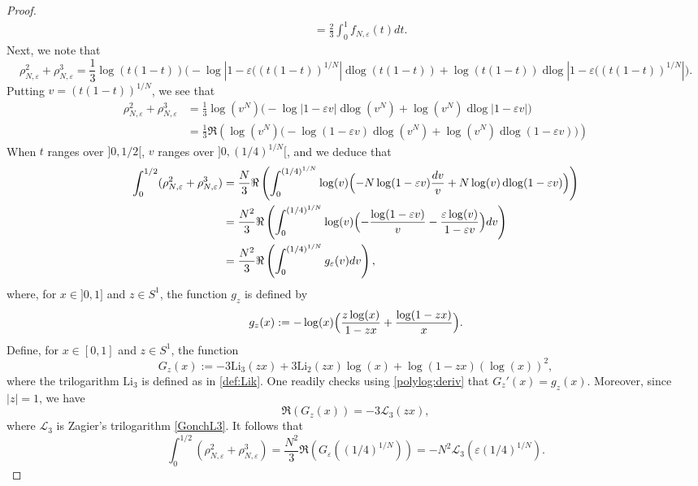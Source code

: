 \documentclass[10pt,a4paper]{amsart}
\newcommand{\dlog}{\operatorname{dlog}}
\newcommand{\e}{\varepsilon}
\begin{document}
\begin{proof}
\begin{align*}
    & = \frac{2}{3}\int_0^{1} f_{N,\e}(t) dt.
\end{align*}
Next, we note that 
\[
\rho_{N, \e}^2+\rho_{N, \e}^3=\frac{1}{3} \log (t(1-t)) \bigl( -\log |1 -\e ((t(1-t))^{1/N}| \dlog (t(1-t)) + \log (t(1-t)) \dlog |1 -\e ((t(1-t))^{1/N}|\bigr).
\]
Putting $v=(t(1-t))^{1/N}$, we see that 
\begin{align*}
\rho_{N, \e}^2+\rho_{N, \e}^3 &=\frac{1}{3} \log (v^N) \bigl( -\log |1 -\e v| \dlog (v^N) + \log (v^N) \dlog |1 -\e v|\bigr) \\
&=\frac{1}{3} \Re\left(\log (v^N) \bigl( -\log (1 -\e v)\dlog (v^N) + \log (v^N) \dlog (1 -\e v)\bigr) \right)
\end{align*}
When $t$ ranges over $]0, 1/2[$, $v$ ranges over $]0,(1/4)^{1/N}[$, and 
we deduce that 
\begin{align*}
\int_0^{1/2} (\rho_{N, \e}^2+\rho_{N, \e}^3) & = \frac{N}{3} \Re \left(\int_{0}^{(1/4)^{1/N}} \log (v) \Bigl( -N\log (1 -\e v) \frac{dv}{v} + N\log (v) \dlog (1 - \e v)\Bigr) \right) \\
& = \frac{N^2}{3} \Re \left(\int_{0}^{(1/4)^{1/N}} \log (v) \Bigl( - \frac{\log (1 -\e v)}{v} - \frac{\e \log (v)}{1 -\e v} \Bigr) dv \right) \\
& = \frac{N^2}{3} \Re \left(\int_{0}^{(1/4)^{1/N}} g_{\e}(v) dv \right),
\end{align*}
where, for $x\in ]0,1]$ and $z\in S^1$, the function $g_{z}$ is defined by
\begin{equation}
    g_{z}(x):=- \log (x) \Bigl(  \frac{z \log (x)}{1-z x} +\frac{\log (1-z x)}{x} \Bigr).
\end{equation}
Define, for $x\in [0, 1]$ and $z\in S^1$, the function 
\begin{equation}\label{fct:Gzx}
    G_{z}(x):=-3\mathrm{Li}_3(z x)+3\mathrm{Li}_2(z x)\log(x)+\log(1-z x)(\log(x))^2,
\end{equation}
where the trilogarithm $\mathrm{Li}_3$ is defined as in \eqref{def:Lik}. One readily checks using \eqref{polylog:deriv} that $G_{z}'(x)=g_z (x)$. Moreover, since $\vert z\vert = 1$, we have
\begin{equation}\label{GtoL3}
\Re(G_z(x))=-3\mathcal{L}_3(z x),
\end{equation}
where $\mathcal{L}_3$ is Zagier's trilogarithm \eqref{GonchL3}.
It follows that 
\begin{equation*}
\int_0^{1/2} (\rho_{N, \e}^2+\rho_{N, \e}^3) = \frac{N^2}{3} \Re \left(  G_{\e}((1/4)^{1/N}) \right)=-N^2 \mathcal{L}_3(\e (1/4)^{1/N}).
\end{equation*}

\end{proof}
\end{document}
